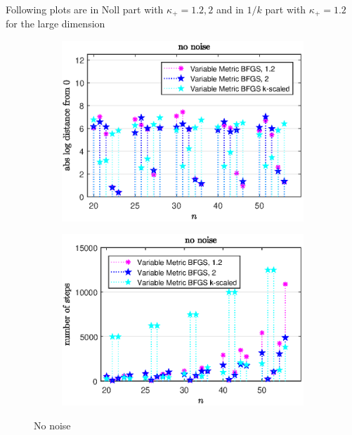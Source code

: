 Following plots are in Noll part with \(\kappa_+ = 1.2, 2\) and in \(1/k\) part with \(\kappa_+ = 1.2\) for the large dimension
\begin{figure}[H]%
	\begin{subfigure}{0.49\textwidth}
		\includegraphics[width=\textwidth]{Pictures/Plots/no_noise_compb.eps}%
	\end{subfigure}
	\begin{subfigure}{0.49\textwidth}
		\includegraphics[width=\textwidth]{Pictures/Plots/steps_no_noise_compb.eps}%
	\end{subfigure}
	\label{fig_no_noise_comp_large}
	\caption{No noise}
\end{figure}

